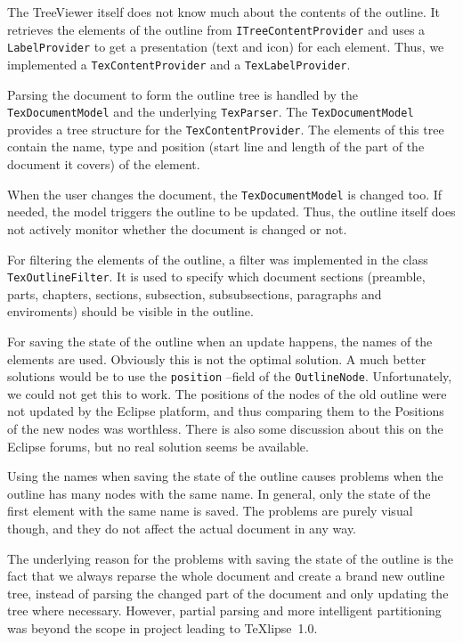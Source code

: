 \documentclass[a4paper,11pt,twoside]{article}
\newcommand{\texlipse}{\TeX lipse}
\begin{document}
The TreeViewer itself does not know much about the contents of the outline. It 
retrieves the elements of the outline from \texttt{ITreeContentProvider} and 
uses a \texttt{LabelProvider} to get a presentation (text and icon) for each 
element. Thus, we implemented a \texttt{TexContentProvider} and a 
\texttt{TexLabelProvider}.

Parsing the document to form the outline tree is handled by the 
\texttt{TexDocumentModel} and the underlying \texttt{TexParser}. The 
\texttt{TexDocumentModel} provides a tree structure for the 
\texttt{TexContentProvider}. The elements of this tree contain the name, type 
and position (start line and length of the part of the document it covers) of 
the element.

When the user changes the document, the \texttt{TexDocumentModel} is changed too. 
If needed, the model triggers the outline to be updated. Thus, the outline itself 
does not actively monitor whether the document is changed or not.

For filtering the elements of the outline, a filter was implemented in the 
class \texttt{TexOutlineFilter}. It is used to specify which document sections 
(preamble, parts, chapters, sections, subsection, subsubsections, paragraphs 
and enviroments) should be visible in the outline.

For saving the state of the outline when an update happens, the names of the 
elements are used. Obviously this is not the optimal solution. A much better 
solutions would be to use the \texttt{position} --field of the 
\texttt{OutlineNode}. Unfortunately, we could not get this to work. The 
positions of the nodes of the old outline were not updated by the Eclipse 
platform, and thus comparing them to the Positions of the new nodes was 
worthless. There is also some discussion about this on the Eclipse forums, but 
no real solution seems be available.

Using the names when saving the state of the outline causes problems when the 
outline has many nodes with the same name. In general, only the state of the 
first element with the same name is saved. The problems are purely visual 
though, and they do not affect the actual document in any way.

The underlying reason for the problems with saving the state of the outline is
the fact that we always reparse the whole document and create a brand new
outline tree, instead of parsing the changed part of the document and only
updating the tree where necessary. However, partial parsing and more
intelligent partitioning was beyond the scope in project leading to \texlipse\
1.0.
\end{document}
